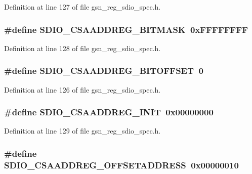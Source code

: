 Definition at line 127 of file gsn\_\-reg\_\-sdio\_\-spec.h.

\hypertarget{a00571_a2e78bef11d906487c22e8cc046e31dea}{
\subsubsection[{SDIO\_\-CSAADDREG\_\-BITMASK}]{\setlength{\rightskip}{0pt plus 5cm}\#define SDIO\_\-CSAADDREG\_\-BITMASK~0xFFFFFFFF}}
\label{a00571_a2e78bef11d906487c22e8cc046e31dea}


Definition at line 128 of file gsn\_\-reg\_\-sdio\_\-spec.h.

\hypertarget{a00571_a2d53bb1b864a861629bf2d922e51000f}{
\subsubsection[{SDIO\_\-CSAADDREG\_\-BITOFFSET}]{\setlength{\rightskip}{0pt plus 5cm}\#define SDIO\_\-CSAADDREG\_\-BITOFFSET~0}}
\label{a00571_a2d53bb1b864a861629bf2d922e51000f}


Definition at line 126 of file gsn\_\-reg\_\-sdio\_\-spec.h.

\hypertarget{a00571_ad4409bd49d9981f1af05930dae31c8d1}{
\subsubsection[{SDIO\_\-CSAADDREG\_\-INIT}]{\setlength{\rightskip}{0pt plus 5cm}\#define SDIO\_\-CSAADDREG\_\-INIT~0x00000000}}
\label{a00571_ad4409bd49d9981f1af05930dae31c8d1}


Definition at line 129 of file gsn\_\-reg\_\-sdio\_\-spec.h.

\hypertarget{a00571_a8ba78d915908f8714e88e858da6deceb}{
\subsubsection[{SDIO\_\-CSAADDREG\_\-OFFSETADDRESS}]{\setlength{\rightskip}{0pt plus 5cm}\#define SDIO\_\-CSAADDREG\_\-OFFSETADDRESS~0x00000010}}
\label{a00571_a8ba78d915908f8714e88e858da6deceb}


